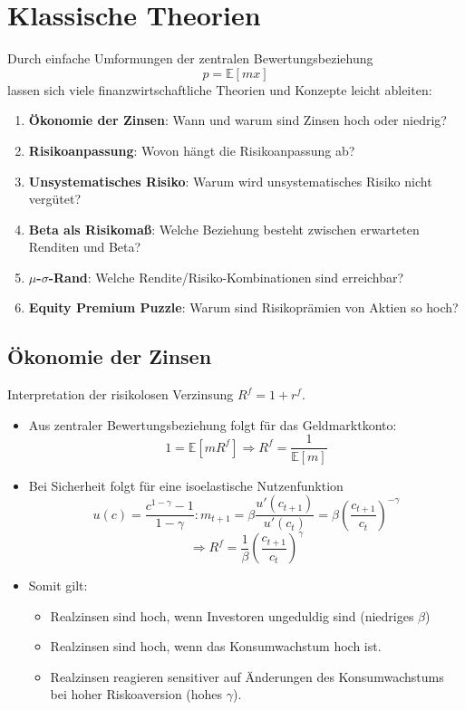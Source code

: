 \documentclass[12pt]{extreport} %
\theoremstyle{named}
\theoremstyle{nnamed}
\theoremstyle{itshape}
\theoremstyle{normal}
\begin{document}
\chapter{Klassische Theorien}

Durch einfache Umformungen der zentralen Bewertungsbeziehung
$$ p = \mathbb{E}[mx] $$
lassen sich viele finanzwirtschaftliche Theorien und Konzepte leicht ableiten:
\begin{enumerate}[label=\arabic*\upshape.]
	\item \textbf{Ökonomie der Zinsen}: Wann und warum sind Zinsen hoch oder niedrig?
	\item \textbf{Risikoanpassung}: Wovon hängt die Risikoanpassung ab?
	\item \textbf{Unsystematisches Risiko}: Warum wird unsystematisches Risiko nicht vergütet?
	\item \textbf{Beta als Risikomaß}: Welche Beziehung besteht zwischen erwarteten Renditen und Beta?
	\item \textbf{$\mu$-$\sigma$-Rand}: Welche Rendite/Risiko-Kombinationen sind erreichbar?
	\item \textbf{Equity Premium Puzzle}: Warum sind Risikoprämien von Aktien so hoch?
\end{enumerate}

\section{Ökonomie der Zinsen}

Interpretation der risikolosen Verzinsung $R^f = 1 + r^f$.
\begin{itemize}
	\item Aus zentraler Bewertungsbeziehung folgt für das Geldmarktkonto:
		$$ 1 = \mathbb{E} \left[ m R^f \right] \Rightarrow R^f = \frac{1}{\mathbb{E}[m]} $$
	\item Bei Sicherheit folgt für eine isoelastische Nutzenfunktion
		$$ u(c) = \frac{c^{1-\gamma} - 1}{1 - \gamma}: m_{t+1} = \beta \frac{u'(c_{t+1})}{u'(c_{t})} = \beta \left( \frac{c_{t+1}}{c_t} \right)^{-\gamma} $$
		$$ \Rightarrow R^f = \frac{1}{\beta} \left( \frac{c_{t+1}}{c_t} \right)^{\gamma} $$
	\item Somit gilt:
		\begin{itemize}
			\item Realzinsen sind hoch, wenn Investoren ungeduldig sind (niedriges $\beta$)
			\item Realzinsen sind hoch, wenn das Konsumwachstum hoch ist.
			\item Realzinsen reagieren sensitiver auf Änderungen des Konsumwachstums bei hoher Riskoaversion (hohes $\gamma$).
		\end{itemize}
\end{itemize}
	
\end{document}
